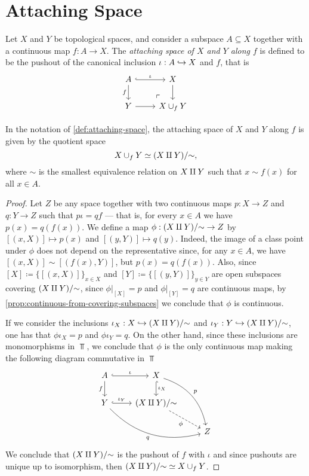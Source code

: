 \section{Attaching Space}

\begin{definition}
\label{def:attaching-space}
Let \(X\) and \(Y\) be topological spaces, and consider a subspace
\(A \subseteq X\) together with a continuous map \(f: A \to X\). The
\emph{attaching space of \(X\) and \(Y\) along \(f\)} is defined to be the
pushout of the canonical inclusion \(\iota: A \hookrightarrow X\) and \(f\), that is
\[
\begin{tikzcd}
A \ar[r, hook, "\iota"] \ar[d, "f"']
\ar[rd, phantom, very near end, "\ulcorner"]
&X \ar[d] \\
Y \ar[r] &X \cup_f Y
\end{tikzcd}
\]
\end{definition}

\begin{corollary}
\label{cor:attaching-space-as-quotient}
In the notation of \cref{def:attaching-space}, the attaching space of \(X\) and
\(Y\) along \(f\) is given by the quotient space
\[
X \cup_f Y \simeq (X \amalg Y)/{\sim},
\]
where \(\sim\) is the smallest equivalence relation on \(X \amalg Y\) such that
\(x \sim f(x)\) for all \(x \in A\).
\end{corollary}

\begin{proof}
Let \(Z\) be any space together with two continuous maps \(p: X \to Z\) and
\(q: Y \to Z\) such that \(p \iota = q f\) --- that is, for every \(x \in A\) we
have \(p(x) = q(f(x))\). We define a map \(\phi: (X \amalg Y)/{\sim} \to Z\) by
\([(x, X)] \mapsto p(x)\) and \([(y, Y)] \mapsto q(y)\). Indeed, the image of a
class point under \(\phi\) does not depend on the representative since, for any
\(x \in A\), we have \([(x, X)] \sim [(f(x), Y)]\), but \(p(x) =
q(f(x))\). Also, since \([X] \coloneq \{[(x, X)]\}_{x \in X}\) and
\([Y] \coloneq \{[(y, Y)]\}_{y \in Y}\) are open subspaces covering
\((X \amalg Y)/{\sim}\), since \(\phi|_{[X]} = p\) and \(\phi|_{[Y]} = q\) are
continuous maps, by \cref{prop:continuous-from-covering-subspaces} we conclude
that \(\phi\) is continuous.

If we consider the inclusions \(\iota_X: X \hookrightarrow (X \amalg Y)/{\sim}\) and
\(\iota_Y: Y \hookrightarrow (X \amalg Y)/{\sim}\), one has that \(\phi \iota_X = p\) and
\(\phi \iota_Y = q\). On the other hand, since these inclusions are
monomorphisms in \(\Top\), we conclude that \(\phi\) is the only continuous map
making the following diagram commutative in \(\Top\)
\[
\begin{tikzcd}
A \ar[r, hook, "\iota"] \ar[d, "f"']
&X \ar[drd, bend left, "p"] \ar[d, hook, "\iota_X"]  &\\
Y \ar[r, "\iota_Y", hook] \ar[rrd, "q"', bend right]
&(X \disj Y)/{\sim} \ar[rd, "\phi"', dashed]  &\\
& &Z
\end{tikzcd}
\]
We conclude that \((X \amalg Y)/{\sim}\) is the pushout of \(f\) with \(\iota\)
and since pushouts are unique up to isomorphism, then
\((X \amalg Y)/{\sim} \simeq X \cup_f Y\).
\end{proof}

